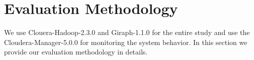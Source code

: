 \documentclass[conference]{IEEEtran}
\begin{document}


\section {Evaluation Methodology} \label{EvaluationMethodology}
We use Clouera-Hadoop-2.3.0 and Giraph-1.1.0 for the entire study and use the Cloudera-Manager-5.0.0 for monitoring the system behavior. In this section we provide our evaluation methodology in details. 
\end{document}
